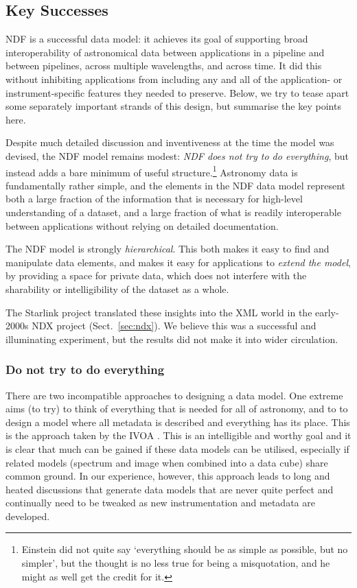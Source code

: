 \documentclass[final,authoryear,5p,times,twocolumn]{elsarticle}
\newcommand*\secref[1]{Sect.~\ref{#1}}
\begin{document}
\subsection{Key Successes}
\label{sec:success}

NDF is a successful data model: it achieves its goal of supporting
broad interoperability of astronomical data between applications in a
pipeline and between pipelines, across multiple wavelengths, and
across time.  It did this without inhibiting applications from
including any and all of the application- or instrument-specific
features they needed to preserve.  Below, we try to tease apart some
separately important strands of this design, but summarise the key
points here.

Despite much detailed discussion and inventiveness at the time the
model was devised, the NDF model remains modest: \emph{NDF does not
  try to do everything}, but instead adds a bare minimum of useful
structure.\footnote{Einstein did not quite say `everything should be
  as simple as possible, but no simpler', but the thought is no less
  true for being a misquotation, and he might as well get the credit
  for it.}  Astronomy data is fundamentally rather simple, and the
elements in the NDF data model represent both a large fraction of the
information that is necessary for high-level understanding of a
dataset, and a large fraction of what is readily interoperable between
applications without relying on detailed documentation.

The NDF model is strongly \emph{hierarchical}.  This both makes it
easy to find and manipulate data elements, and makes it easy for
applications to \emph{extend the model}, by providing a space for
private data, which does not interfere with the sharability or
intelligibility of the dataset as a whole.

The Starlink project translated these insights into the XML world in
the early-2000s NDX project (\secref{sec:ndx}).  We believe this was a
successful and illuminating experiment, but the results did not make
it into wider circulation.

\subsubsection{Do not try to do everything}

There are two incompatible approaches to designing a data model. One
extreme aims (to try) to think of everything that is needed for
all of astronomy, and to to design a model where all metadata is
described and everything has its place. This is the approach taken by
the IVOA \citep[see e.g.][]{2012arXiv1204.3055M}. This is an
intelligible and worthy goal and it is clear that
much can be gained if these data models can be utilised, especially if
related models (spectrum and image when combined into a data cube)
share common ground.  In our experience, however, this approach leads to long and
heated discussions that generate data models that are never quite
perfect and continually need to be tweaked as new instrumentation and
metadata are developed.
\end{document}
